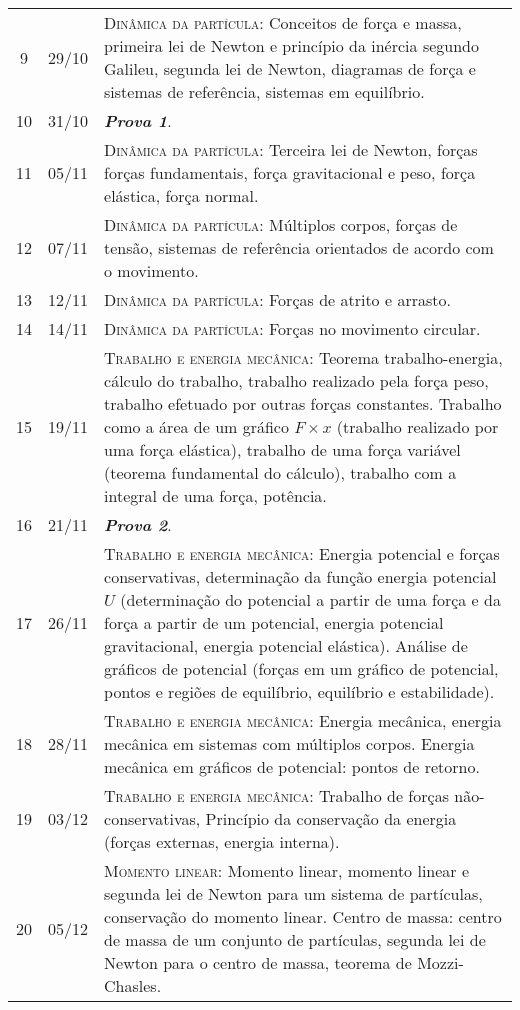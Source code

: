 \begin{center}
\begin{longtable}{ccp{70mm}}
9	 & 	29/10	 & 	\textsc{Dinâmica da partícula:} Conceitos de força e massa, primeira lei de Newton e princípio da inércia segundo Galileu, segunda lei de Newton, diagramas de força e sistemas de referência, sistemas em equilíbrio. \\
10	 & 	31/10	 & 	\textbf{\textit{Prova 1}}. \\
11	 & 	05/11	 & 	\textsc{Dinâmica da partícula:} Terceira lei de Newton, forças forças fundamentais, força gravitacional e peso, força elástica, força normal. \\
12	 & 	07/11	 & 	\textsc{Dinâmica da partícula:} Múltiplos corpos, forças de tensão, sistemas de referência orientados de acordo com o movimento. \\
13	 & 	12/11	 & 	\textsc{Dinâmica da partícula:} Forças de atrito e arrasto. \\
14	 & 	14/11	 & 	\textsc{Dinâmica da partícula:} Forças no movimento circular. \\
15	 & 	19/11	 & 	\textsc{Trabalho e energia mecânica:} Teorema trabalho-energia, cálculo do trabalho, trabalho realizado pela força peso, trabalho efetuado por outras forças constantes. Trabalho como a área de um gráfico $F \times x$ (trabalho realizado por uma força elástica), trabalho de uma força variável (teorema fundamental do cálculo), trabalho com a integral de uma força, potência. \\
16	 & 	21/11	 & 	\textbf{\textit{Prova 2}}. \\
17	 & 	26/11	 & 	\textsc{Trabalho e energia mecânica:} Energia potencial e forças conservativas, determinação da função energia potencial $U$ (determinação do potencial a partir de uma força e da força a partir de um potencial, energia potencial gravitacional, energia potencial elástica). Análise de gráficos de potencial (forças em um gráfico de potencial, pontos e regiões de equilíbrio, equilíbrio e estabilidade). \\
18	 & 	28/11	 & 	\textsc{Trabalho e energia mecânica:} Energia mecânica, energia mecânica em sistemas com múltiplos corpos. Energia mecânica em gráficos de potencial: pontos de retorno. \\
19	 & 	03/12	 & 	\textsc{Trabalho e energia mecânica:} Trabalho de forças não-conservativas, Princípio da conservação da energia (forças externas, energia interna). \\
20	 & 	05/12	 & 	\textsc{Momento linear:} Momento linear, momento linear e segunda lei de Newton para um sistema de partículas, conservação do momento linear. Centro de massa: centro de massa de um conjunto de partículas, segunda lei de Newton para o centro de massa, teorema de Mozzi-Chasles. \\

\end{longtable}
\end{center}

